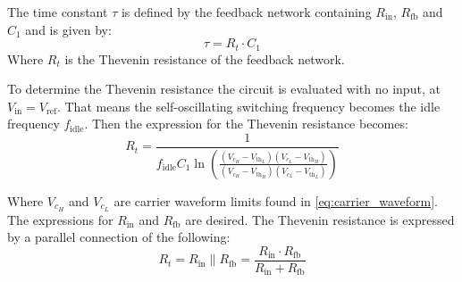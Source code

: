 The time constant $\tau$ is defined by the feedback network containing $R_{\mathrm{in}}$, $R_{\mathrm{fb}}$ and $C_{1}$ and is given by:
\begin{equation} \label{eq:aim_time_constant}
	\tau = R_{t} \cdot C_{1}
\end{equation}
Where $R_{t}$ is the Thevenin resistance of the feedback network.

To determine the Thevenin resistance the circuit is evaluated with no input, at $V_{\mathrm{in}} = V_{\mathrm{ref}}$. That means the self-oscillating switching frequency becomes the idle frequency $f_{\mathrm{idle}}$. 
Then the expression for the Thevenin resistance becomes:
\begin{equation} \label{eq:modulator_thevenin_resistance}
	R_t = \frac{1}{f_{\mathrm{idle}} C_{1} \ln{ \left( \frac{(V_{c_{H}} - V_{\mathrm{th}_{L}})(V_{c_{L}} - V_{\mathrm{th}_{H}})}{(V_{c_{H}} - V_{\mathrm{th}_{H}})(V_{c_{L}} - V_{\mathrm{th}_{L}})} \right) }}
\end{equation}

Where $V_{c_{H}}$ and $V_{c_{L}}$ are carrier waveform limits found in \autoref{eq:carrier_waveform}. The expressions for $R_{\mathrm{in}}$ and $R_{\mathrm{fb}}$ are desired.
The Thevenin resistance is expressed by a parallel connection of the following:
\begin{equation}
	R_{t} = R_{\mathrm{in}} \parallel R_{\mathrm{fb}} = \frac{R_{\mathrm{in}} \cdot R_{\mathrm{fb}}}{R_{\mathrm{in}} + R_{\mathrm{fb}}}
\end{equation}

